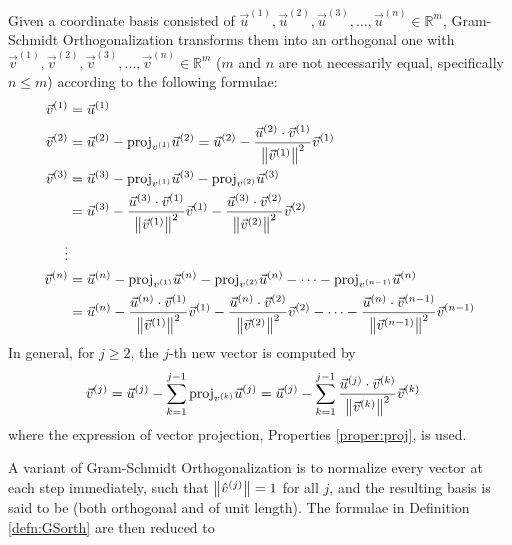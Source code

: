 \begin{defn}
\label{defn:GSorth}
Given a coordinate basis consisted of $\vec{u}^{(1)}, \vec{u}^{(2)}, \vec{u}^{(3)}, \ldots, \vec{u}^{(n)} \in \mathbb{R}^m$, Gram-Schmidt Orthogonalization transforms them into an orthogonal one with $\vec{v}^{(1)}, \vec{v}^{(2)}, \vec{v}^{(3)}, \ldots, \vec{v}^{(n)} \in \mathbb{R}^m$ ($m$ and $n$ are not necessarily equal, specifically $n \leq m$) according to the following formulae:
\begin{align}
\vec{v}^{(1)} &= \vec{u}^{(1)} \nonumber \\
\vec{v}^{(2)} &= \vec{u}^{(2)} - \text{proj}_{v^{(1)}}\vec{u}^{(2)} = \vec{u}^{(2)} - \frac{\vec{u}^{(2)} \cdot \vec{v}^{(1)}}{\norm{\vec{v}^{(1)}}^2} \vec{v}^{(1)} \nonumber \\
\vec{v}^{(3)} &= \vec{u}^{(3)} - \text{proj}_{v^{(1)}}\vec{u}^{(3)} - \text{proj}_{v^{(2)}}\vec{u}^{(3)} \\
&= \vec{u}^{(3)} - \frac{\vec{u}^{(3)} \cdot \vec{v}^{(1)}}{\norm{\vec{v}^{(1)}}^2} \vec{v}^{(1)} - \frac{\vec{u}^{(3)} \cdot \vec{v}^{(2)}}{\norm{\vec{v}^{(2)}}^2} \vec{v}^{(2)} \nonumber \\
\vdots \nonumber \\
\vec{v}^{(n)} &= \vec{u}^{(n)} - \text{proj}_{v^{(1)}}\vec{u}^{(n)} - \text{proj}_{v^{(2)}}\vec{u}^{(n)} - \cdots - \text{proj}_{v^{(n-1)}}\vec{u}^{(n)} \nonumber \\
&= \vec{u}^{(n)} - \frac{\vec{u}^{(n)} \cdot \vec{v}^{(1)}}{\norm{\vec{v}^{(1)}}^2} \vec{v}^{(1)} - \frac{\vec{u}^{(n)} \cdot \vec{v}^{(2)}}{\norm{\vec{v}^{(2)}}^2} \vec{v}^{(2)} - \cdots - \frac{\vec{u}^{(n)} \cdot \vec{v}^{(n-1)}}{\norm{\vec{v}^{(n-1)}}^2} \vec{v}^{(n-1)} \nonumber
\end{align}
In general, for $j \geq 2$, the $j$-th new vector is computed by
\begin{align}
\vec{v}^{(j)} &= \vec{u}^{(j)} - \sum_{k=1}^{j-1}\text{proj}_{v^{(k)}}\vec{u}^{(j)}  = \vec{u}^{(j)} - \sum_{k=1}^{j-1}\frac{\vec{u}^{(j)} \cdot \vec{v}^{(k)}}{\norm{\vec{v}^{(k)}}^2} \vec{v}^{(k)}
\end{align}
where the expression of vector projection, Properties \ref{proper:proj}, is used.
\end{defn}
A variant of Gram-Schmidt Orthogonalization is to normalize every vector at each step immediately, such that $\norm{\hat{v}^{(j)}} = 1$ for all $j$, and the resulting basis is said to be  (both orthogonal and of unit length). The formulae in Definition \ref{defn:GSorth} are then reduced to
